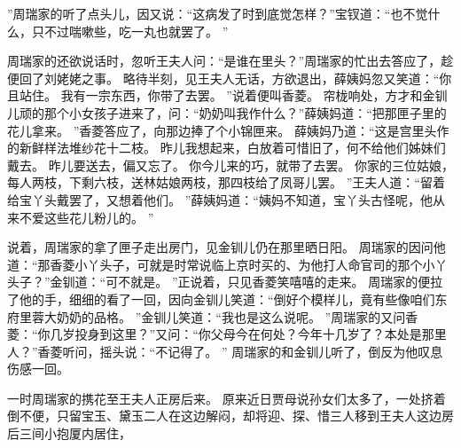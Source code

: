 ”周瑞家的听了点头儿，因又说：“这病发了时到底觉怎样？”宝钗道：“也不觉什么，只不过喘嗽些，吃一丸也就罢了。
”\par
周瑞家的还欲说话时，忽听王夫人问：“是谁在里头？”周瑞家的忙出去答应了，趁便回了刘姥姥之事。
略待半刻，见王夫人无话，方欲退出，薛姨妈忽又笑道：“你且站住。
我有一宗东西，你带了去罢。
”说着便叫香菱。
帘栊响处，方才和金钏儿顽的那个小女孩子进来了，问：“奶奶叫我作什么？”薛姨妈道：“把那匣子里的花儿拿来。
”香菱答应了，向那边捧了个小锦匣来。
薛姨妈乃道：“这是宫里头作的新鲜样法堆纱花十二枝。
昨儿我想起来，白放着可惜旧了，何不给他们姊妹们戴去。
昨儿要送去，偏又忘了。
你今儿来的巧，就带了去罢。
你家的三位姑娘，每人两枝，下剩六枝，送林姑娘两枝，那四枝给了凤哥儿罢。
”王夫人道：“留着给宝丫头戴罢了，又想着他们。
”薛姨妈道：“姨妈不知道，宝丫头古怪呢，他从来不爱这些花儿粉儿的。
”\par
说着，周瑞家的拿了匣子走出房门，见金钏儿仍在那里晒日阳。
周瑞家的因问他道：“那香菱小丫头子，可就是时常说临上京时买的、为他打人命官司的那个小丫头子？”金钏道：“可不就是。
”正说着，只见香菱笑嘻嘻的走来。
周瑞家的便拉了他的手，细细的看了一回，因向金钏儿笑道：“倒好个模样儿，竟有些像咱们东府里蓉大奶奶的品格。
”金钏儿笑道：“我也是这么说呢。
”周瑞家的又问香菱：“你几岁投身到这里？”又问：“你父母今在何处？今年十几岁了？本处是那里人？”香菱听问，摇头说：“不记得了。
”
周瑞家的和金钏儿听了，倒反为他叹息伤感一回。
\par
一时周瑞家的携花至王夫人正房后来。
原来近日贾母说孙女们太多了，一处挤着倒不便，只留宝玉、黛玉二人在这边解闷，却将迎、探、惜三人移到王夫人这边房后三间小抱厦内居住，
